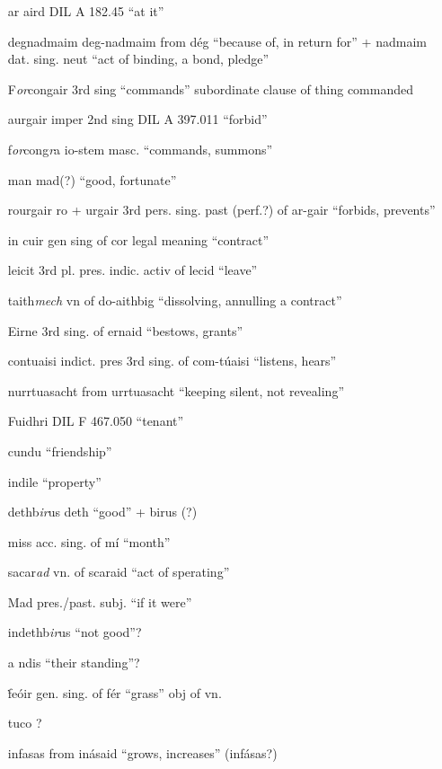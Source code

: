 \documentclass[11pt]{article}
\begin{document}
\begin{enumerate}
  \item[ar aird] DIL A 182.45 \enquote{at it}
  \item[degnadmaim] deg-nadmaim from d\'{e}g \enquote{because of, in return for} + nadmaim dat. sing. neut \enquote{act of binding, a bond, pledge}
  \item[F\emph{or}congair] 3rd sing \enquote{commands} subordinate clause of thing commanded
  \item[aurgair] imper 2nd sing DIL A 397.011 \enquote{forbid}
  \item[f\emph{or}cong\emph{r}a] io-stem masc. \enquote{commands, summons}
  \item[man] mad(?) \enquote{good, fortunate}
  \item[rourgair] ro + urgair 3rd pers. sing. past (perf.?) of ar-gair \enquote{forbids, prevents}
  \item[in cuir] gen sing of cor legal meaning \enquote{contract}
  \item[leicit] 3rd pl. pres. indic. activ of lecid \enquote{leave}
  \item[taith\emph{mech}] vn of do-aithbig \enquote{dissolving, annulling a contract}
  \item[Eirne] 3rd sing. of ernaid \enquote{bestows, grants}
  \item[contuaisi] indict. pres 3rd sing. of com-t\'{u}aisi \enquote{listens, hears}
  \item[nurrtuasacht] from urrtuasacht \enquote{keeping silent, not revealing}
  \item[Fuidhri] DIL F 467.050 \enquote{tenant}
  \item[cundu] \enquote{friendship}
  \item[indile] \enquote{property}
  \item[dethb\emph{ir}us] deth \enquote{good} + birus (?)
  \item[miss] acc. sing. of m\'{i} \enquote{month}
  \item[sacar\emph{ad}] vn. of scaraid \enquote{act of sperating}
  \item[Mad] pres./past. subj. \enquote{if it were}
  \item[indethb\emph{ir}us] \enquote{not good}?
  \item[a ndis] \enquote{their standing}?
  \item[\.{f}e\'{o}ir] gen. sing. of f\'{e}r \enquote{grass} obj of vn.
  \item[tuco] ?
  \item[infasas] from in\'{a}said \enquote{grows, increases} (inf\'{a}sas?)

\end{enumerate}
\end{document}
